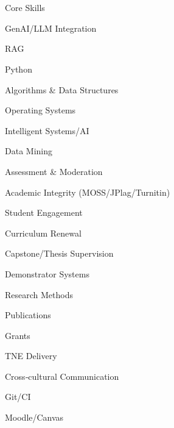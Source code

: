 \section{\faBuilding}{Core Skills}
\begin{itemize*}[noitemsep]
    \item GenAI/LLM Integration
    \item RAG
    \item Python
    \item Algorithms \& Data Structures
    \item Operating Systems
    \item Intelligent Systems/AI
    \item Data Mining
    \item Assessment \& Moderation
    \item Academic Integrity (MOSS/JPlag/Turnitin)
    \item Student Engagement
    \item Curriculum Renewal
    \item Capstone/Thesis Supervision
    \item Demonstrator Systems
    \item Research Methods
    \item Publications
    \item Grants
    \item TNE Delivery
    \item Cross‑cultural Communication
    \item Git/CI
    \item Moodle/Canvas
\end{itemize*}